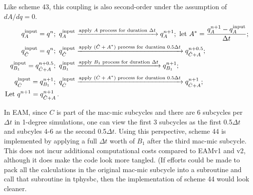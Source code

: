 \documentclass[12pt]{article}
\begin{document}
Like scheme 43, this coupling is also second-order under the assumption of $dA/dq=0$.
\begin{align*}
q^{\rm input}_{A} = q^n;\,\,\,
&q^{\rm input}_{A} \xrightarrow{\text{apply $A$ process for duration $\Delta t$}} q^{n+1}_{A};\,\,
\text{let}\,\, {A}^* = \dfrac{q^{n+1}_{A} - q^{\rm input}_{A}}{\Delta t}; \\
%
q^{\rm input}_{\hat{C}} = q^{n};\,\,\, 
& q^{\rm input}_{\hat{C}}\xrightarrow{\text{apply $(\hat{C}+A^*)$ process for duration $0.5\Delta t$}} q^{n+0.5}_{\hat{C}+A};\,\, 
 \\
%
q^{\rm input}_{B_1} = q^{n+0.5}_{\hat{C}+A};\,\,\, 
& q^{\rm input}_{B_1} \xrightarrow{\text{apply $B_1$ process for duration $\Delta t$}} q^{n+1}_{B_1};\,\,
\\ 
%
q^{\rm input}_{\hat{C}} = q^{n+1}_{B_1};\,\,\, 
& q^{\rm input}_{\hat{C}}\xrightarrow{\text{apply $(\hat{C}+A^*)$ process for duration $0.5\Delta t$}} q^{n+1}_{\hat{C}+A};\,\, 
\\
%
\text{Let}\,\, q^{n+1} = q^{n+1}_{\hat{C}+A} \,.
\end{align*}

In EAM, since $C$ is part of the mac-mic subcycles and there are 6 subcycles per $\Delta t$ in 1-degree simulations, one can view the first 3 subcycles as the first 0.5$\Delta t$ and subcyles 4-6 as the second 0.5$\Delta t$. Using this perspective, scheme 44 is implemented by applying a full $\Delta t$ worth of $B_1$ after the third mac-mic subcycle. This does not incur additional computational costs compared to EAMv1 and v2, although it does make the code look more tangled. (If efforts could be made to pack all the calculations in the original mac-mic subcycle into a subroutine and call that subroutine in {\sf tphysbc}, then the implementation of scheme 44 would look cleaner.
\end{document}

